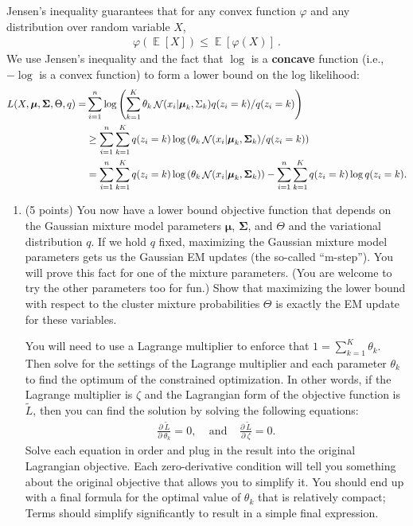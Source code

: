 \documentclass[10pt]{article}
\newcommand{\bmu}{{\boldsymbol \mu}}
\newcommand{\bSigma}{{\boldsymbol \Sigma}}
\DeclareMathOperator*{\E}{{\mathbb E}}
\DeclareMathOperator*{\normal}{{\cal N}}
\begin{document}
\begin{enumerate}
Jensen's inequality guarantees that for any convex function $\varphi$ and any distribution over random variable $X$,
\begin{align}
\varphi\left( \E \left[ X \right] \right) \le \E \left[  \varphi(X) \right]~.
\label{eq:jensen}
\end{align}
We use Jensen's inequality and the fact that $\log$ is a \textbf{concave} function (i.e., $-\log$ is a convex function)  to form a lower bound on the log likelihood:
\begin{align}
L(X, \bmu, \bSigma, \Theta, q) =& \sum_{i=1}^n \log \left(\sum_{k = 1}^K \theta_k \normal(x_i | \bmu_k, \Sigma_k) q(z_i = k) / q(z_i = k) \right)\\
& \ge \sum_{i=1}^n \sum_{k = 1}^K q(z_i = k) \log\left(\theta_k \normal(x_i | \bmu_k, \bSigma_k) / q(z_i = k) \right)\\
& = \sum_{i=1}^n \sum_{k = 1}^K q(z_i = k) \log\left(\theta_k \normal(x_i | \bmu_k, \bSigma_k)\right) - \sum_{i=1}^n \sum_{k=1}^K q(z_i = k) \log q(z_i = k) .
\end{align}

\begin{enumerate}


\item (5 points) You now have a lower bound objective function that depends on the Gaussian mixture model parameters $\bmu$, $\bSigma$, and $\Theta$ and the variational distribution $q$. If we hold $q$ fixed, maximizing the Gaussian mixture model parameters gets us the Gaussian EM updates (the so-called ``m-step''). You will prove this fact for one of the mixture parameters. (You are welcome to try the other parameters too for fun.) Show that maximizing the lower bound with respect to the cluster mixture probabilities $\Theta$ is exactly the EM update for these variables. 

You will need to use a Lagrange multiplier to enforce that $1 = \sum_{k=1}^K \theta_k$. Then solve for the settings of the Lagrange multiplier and each parameter $\theta_k$ to find the optimum of the constrained optimization. In other words, if the Lagrange multiplier is $\zeta$ and the Lagrangian form of the objective function is $\tilde{L}$, then you can find the solution by solving the following equations:
\begin{equation}
\begin{aligned}
\frac{\partial ~ \tilde{L}}{\partial ~ \theta_k} = 0, ~~~~~\textrm{and}~~~~~ \frac{\partial ~ \tilde{L}}{\partial ~ \zeta} = 0.
\end{aligned}
\end{equation}
Solve each equation in order and plug in the result into the original Lagrangian objective. Each zero-derivative condition will tell you something about the original objective that allows you to simplify it. 
You should end up with a final formula for the optimal value of $\theta_k$ that is relatively compact; Terms should simplify significantly to result in a simple final expression.


\end{enumerate}
\end{enumerate}
\end{document}
